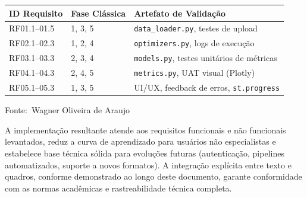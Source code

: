 \documentclass[12pt,a4paper]{article}
\newcommand{\oautor}{Wagner Oliveira de Araujo}
\begin{document}
\begin{quadro}[ht]
\centering
\small
\caption{Matriz de rastreabilidade de requisitos (RTM)}
\label{quadro:rtm}
\begin{threeparttable}
\begin{tabularx}{\textwidth}{|l|l|X|} \hline
\textbf{ID Requisito} & \textbf{Fase Clássica} & \textbf{Artefato de Validação} \\ \hline
RF01.1--01.5 & 1, 3, 5 & \texttt{data\_loader.py}, testes de upload \\ \hline
RF02.1--02.3 & 1, 2, 4 & \texttt{optimizers.py}, logs de execução \\ \hline
RF03.1--03.3 & 2, 3, 4 & \texttt{models.py}, testes unitários de métricas \\ \hline
RF04.1--04.3 & 2, 4, 5 & \texttt{metrics.py}, UAT visual (Plotly) \\ \hline
RF05.1--05.3 & 1, 3, 5 & UI/UX, feedback de erros, \texttt{st.progress} \\ \hline
\end{tabularx}
\begin{tablenotes}[flushleft]
\footnotesize
\item Fonte:~\oautor
\end{tablenotes}
\end{threeparttable}
\end{quadro}

A implementação resultante atende aos requisitos funcionais e não funcionais levantados, reduz a curva de aprendizado para usuários não especialistas e estabelece base técnica sólida para evoluções futuras (autenticação, pipelines automatizados, suporte a novos formatos). A integração explícita entre texto e quadros, conforme demonstrado ao longo deste documento, garante conformidade com as normas acadêmicas e rastreabilidade técnica completa.
\end{document}
